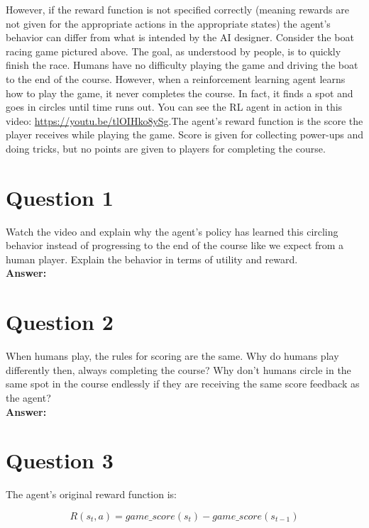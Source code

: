 \documentclass[12pt]{extarticle}
\begin{document}
\noindent However, if the reward function is not specified correctly (meaning rewards are not given for the appropriate actions in the appropriate states) the agent’s behavior can differ from what is intended by the AI designer. Consider the boat racing game pictured above. The goal, as understood by people, is to quickly finish the race. Humans have no difficulty playing the game and driving the boat to the end of the course. However, when a reinforcement learning agent learns how to play the game, it never completes the course. In fact, it finds a spot and goes in circles until time runs out. You can see the RL agent in action in this video: \href{https://youtu.be/tlOIHko8ySg}{https://youtu.be/tlOIHko8ySg}.The agent’s reward function is the score the player receives while playing the game. Score is given for collecting power-ups and doing tricks, but no points are given to players for completing the course.

\newpage
\section*{Question 1}

Watch the video and explain why the agent’s policy has learned this circling behavior instead of progressing to the end of the course like we expect from a human player. Explain the behavior in terms of utility and reward. \\

\noindent\textbf{Answer:}

\newpage
\section*{Question 2}

When humans play, the rules for scoring are the same. Why do humans play differently then, always completing the course? Why don’t humans circle in the same spot in the course endlessly if they are receiving the same score feedback as the agent? \\

\noindent\textbf{Answer:} 

\newpage
\section*{Question 3}

The agent’s original reward function is:

$$R(s_t, a) = game\_score(s_t) - game\_score(s_{t-1})$$
\end{document}
